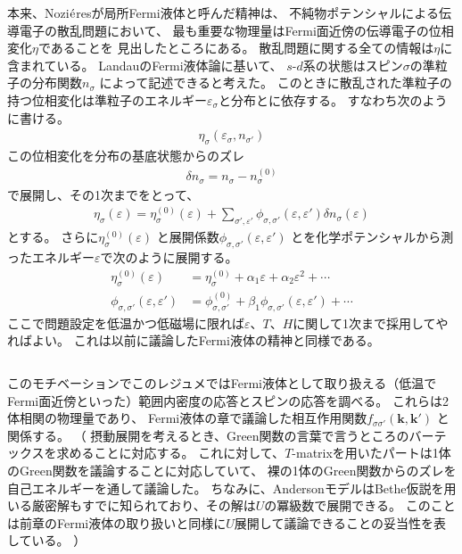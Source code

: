 \documentclass[a4j]{jarticle}
\begin{document}
本来、Nozi$\acute{\rm e}$resが局所Fermi液体と呼んだ精神は、
不純物ポテンシャルによる伝導電子の散乱問題において、
最も重要な物理量はFermi面近傍の伝導電子の位相変化$\eta$であることを
見出したところにある。
散乱問題に関する全ての情報は$\eta$に含まれている。
LandauのFermi液体論に基いて、
$s$-$d$系の状態はスピン$\sigma$の準粒子の分布関数$n_{\sigma}$
によって記述できると考えた。
このときに散乱された準粒子の持つ位相変化は準粒子のエネルギー$\varepsilon_{\sigma}$と分布とに依存する。
すなわち次のように書ける。
\begin{align}
	\eta_{\sigma}(\varepsilon_{\sigma} , n_{\sigma'})
\end{align}
この位相変化を分布の基底状態からのズレ
\begin{align}
	\delta n_{\sigma} = n_{\sigma} - n_{\sigma}^{(0)}
\end{align}
で展開し、その1次までをとって、
\begin{align}
	\eta_{\sigma}(\varepsilon)
	=
	\eta_{\sigma}^{(0)}(\varepsilon)
	+
	\sum_{\sigma',\varepsilon'}
	\phi_{\sigma,\sigma'}(\varepsilon,\varepsilon')
	\delta n_{\sigma}(\varepsilon)
\end{align}
とする。
さらに$\eta_{\sigma}^{(0)}(\varepsilon)$
と展開係数$\phi_{\sigma,\sigma'}(\varepsilon,\varepsilon')$
とを化学ポテンシャルから測ったエネルギー$\varepsilon$で次のように展開する。
\begin{align}
	\eta_{\sigma}^{(0)}(\varepsilon)
	 & =
	\eta_{\sigma}^{(0)}
	+
	\alpha_{1} \varepsilon
	+
	\alpha_{2} \varepsilon^{2}
	+
	\cdots
	\\
	\phi_{\sigma,\sigma'}(\varepsilon,\varepsilon')
	 & =
	\phi_{\sigma,\sigma'}^{(0)}
	+
	\beta_{1}
	\phi_{\sigma,\sigma'}(\varepsilon,\varepsilon')
	+
	\cdots
\end{align}
ここで問題設定を低温かつ低磁場に限れば$\varepsilon$、$T$、$H$に関して1次まで採用してやればよい。
これは以前に議論したFermi液体の精神と同様である。


${}$

このモチベーションでこのレジュメではFermi液体として取り扱える（低温でFermi面近傍といった）範囲内密度の応答とスピンの応答を調べる。
これらは2体相関の物理量であり、
Fermi液体の章で議論した相互作用関数$f_{\sigma\sigma'}(\bm{k},\bm{k}')$
と関係する。
（
摂動展開を考えるとき、Green関数の言葉で言うところのバーテックスを求めることに対応する。
これに対して、$T$-matrixを用いたパートは1体のGreen関数を議論することに対応していて、
裸の1体のGreen関数からのズレを自己エネルギーを通して議論した。
ちなみに、AndersonモデルはBethe仮説を用いる厳密解もすでに知られており、その解は$U$の冪級数で展開できる。
このことは前章のFermi液体の取り扱いと同様に$U$展開して議論できることの妥当性を表している。
）
\end{document}

